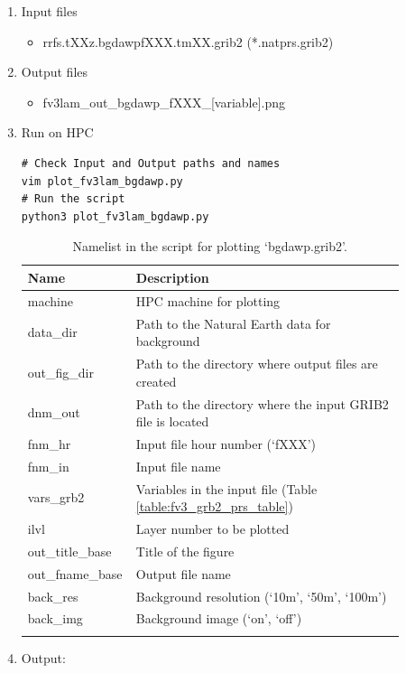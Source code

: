 \documentclass[11pt,fleqn]{report}              %
\begin{document}
\begin{enumerate}
\item Input files
\begin{itemize}
\item rrfs.tXXz.bgdawpfXXX.tmXX.grib2 (*.natprs.grib2)
\end{itemize}
\item Output files
\begin{itemize}
\item fv3lam\_out\_bgdawp\_fXXX\_[variable].png
\end{itemize}
\item Run on HPC

\lstset{language=bash}   
\begin{lstlisting}[frame=trBL]
# Check Input and Output paths and names
vim plot_fv3lam_bgdawp.py
# Run the script
python3 plot_fv3lam_bgdawp.py
\end{lstlisting}

{
\fontsize{10}{12}\selectfont
\begin{longtable}{p{0.17\linewidth} | p{0.7\linewidth} }
\hline
\hline
Name & Description \\
\hline
 machine & HPC machine for plotting \\
 data\_dir & Path to the Natural Earth data for background \\
 out\_fig\_dir & Path to the directory where output files are created \\
 dnm\_out & Path to the directory where the input GRIB2 file is located   \\
 fnm\_hr & Input file hour number (`fXXX') \\
 fnm\_in & Input file name \\
 vars\_grb2 & Variables in the input file (Table \ref{table:fv3_grb2_prs_table})\\ 
 ilvl & Layer number to be plotted \\
 out\_title\_base & Title of the figure \\
 out\_fname\_base & Output file name \\
 back\_res & Background resolution (`10m', `50m', `100m') \\
 back\_img & Background image (`on', `off') \\
\hline
\caption{Namelist in the script for plotting `bgdawp.grib2'.}
\label{table:fv3_var_prs_grib2}
\end{longtable}
}

\item Output:


\end{enumerate}
\end{document}
